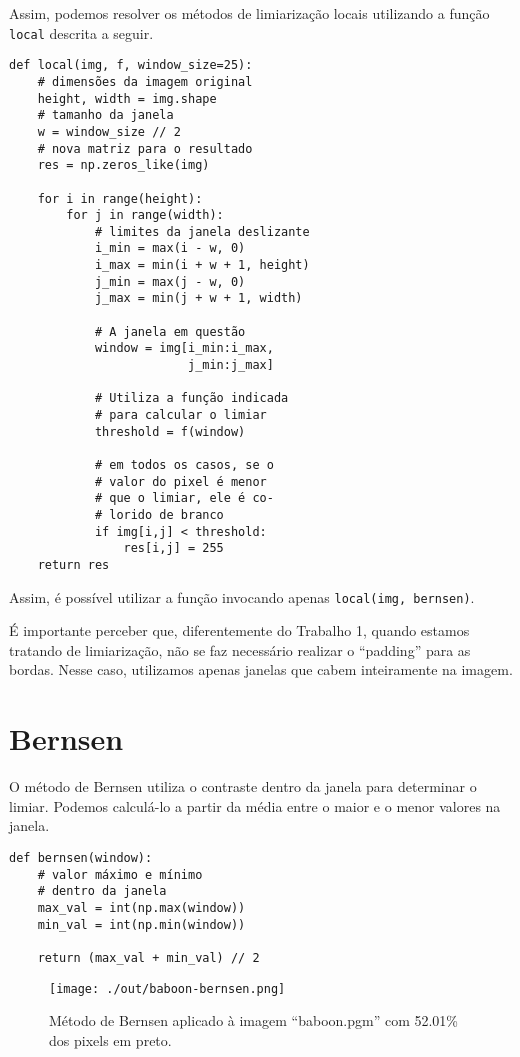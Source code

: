 \documentclass[twocolumn, 10pt]{article}
\begin{document}
Assim, podemos resolver os métodos de limiarização locais utilizando a função \texttt{local} descrita a seguir.
\begin{verbatim}
def local(img, f, window_size=25):
    # dimensões da imagem original
    height, width = img.shape
    # tamanho da janela
    w = window_size // 2
    # nova matriz para o resultado
    res = np.zeros_like(img)

    for i in range(height):
        for j in range(width):
            # limites da janela deslizante
            i_min = max(i - w, 0)
            i_max = min(i + w + 1, height)
            j_min = max(j - w, 0)
            j_max = min(j + w + 1, width)

            # A janela em questão
            window = img[i_min:i_max,
                         j_min:j_max]

            # Utiliza a função indicada
            # para calcular o limiar
            threshold = f(window)

            # em todos os casos, se o
            # valor do pixel é menor
            # que o limiar, ele é co-
            # lorido de branco
            if img[i,j] < threshold:
                res[i,j] = 255
    return res
\end{verbatim}
Assim, é possível utilizar a função invocando apenas \texttt{local(img, bernsen)}.

É importante perceber que, diferentemente do Trabalho 1, quando estamos tratando de limiarização, não se faz necessário realizar o ``padding'' para as bordas.
Nesse caso, utilizamos apenas janelas que cabem inteiramente na imagem.
\section*{Bernsen}
\label{sec:org99d612b}
O método de Bernsen utiliza o contraste dentro da janela para determinar o limiar.
Podemos calculá-lo a partir da média entre o maior e o menor valores na janela.
\begin{verbatim}
def bernsen(window):
    # valor máximo e mínimo
    # dentro da janela
    max_val = int(np.max(window))
    min_val = int(np.min(window))

    return (max_val + min_val) // 2
\end{verbatim}
\begin{figure}[htbp]
\centering
\texttt{[image: ./out/baboon-bernsen.png]}
\caption{Método de Bernsen aplicado à imagem ``baboon.pgm'' com 52.01\% dos pixels em preto.}
\end{figure}
\end{document}
